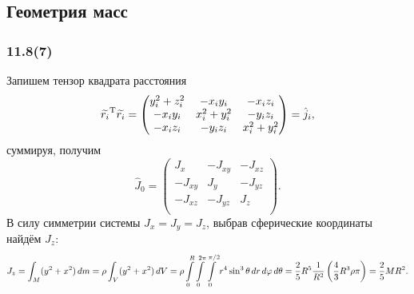 \subsection{Геометрия масс}

\subsubsection*{11.8(7)}
Запишем тензор квадрата расстояния
\begin{equation}
\label{t1}
    \widetilde{r_i}^{\text{T}} \widetilde{r_i} = \begin{pmatrix}
        y_i^2 + z_i^2 & -x_i y_i & - x_i z_i \\
        -x_i y_i & x_i^2 + y_i^2 & - y_i z_i \\
        -x_i z_i & -y_i z_i & x_i^2 + y_i^2 \\
    \end{pmatrix} = \hat j_i,
\end{equation}
суммируя, получим
\begin{equation}
\label{t2}
    \hat J_0 = \begin{pmatrix}
        J_x & - J_{xy} & -J_{xz} \\
        -J_{xy} & J_y & -J_{yz} \\
        -J_{xz} & -J_{yz} & J_z \\
    \end{pmatrix}.
\end{equation}
В силу симметрии системы $J_x = J_y = J_z$, выбрав сферические координаты найдём $J_z$:
\begin{equation}
\label{t3}
    J_z = \int_M (y^2 + x^2) \, d m = \rho \int_V (y^2 + x^2) \, d V =
    \rho \int\limits_0^R \int\limits_0^{2\pi} \int\limits_0^{\pi/2} r^4 \sin^3 \theta \, d r \, d \varphi \, d \theta = 
    \frac{2}{5} R^5 \frac{1}{R^2}  \left(\frac{4}{3} R^3 \rho \pi \right) = \frac{2}{5} M R^2.
\end{equation}




